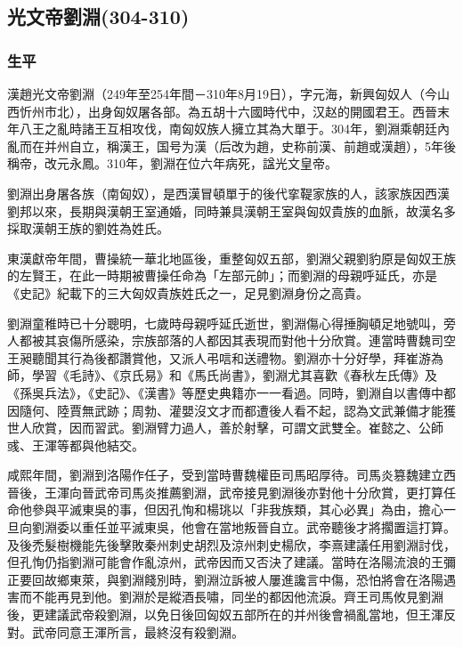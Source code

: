 
\subsection{光文帝劉淵\tiny(304-310)}

\subsubsection{生平}

漢趙光文帝劉淵（249年至254年間－310年8月19日），字元海，新興匈奴人（今山西忻州市北），出身匈奴屠各部。為五胡十六國時代中，汉赵的開國君王。西晉末年八王之亂時諸王互相攻伐，南匈奴族人擁立其為大單于。304年，劉淵乘朝廷內亂而在并州自立，稱漢王，国号为漢（后改为趙，史称前漢、前趙或漢趙），5年後稱帝，改元永鳳。310年，劉淵在位六年病死，諡光文皇帝。

劉淵出身屠各族（南匈奴），是西漢冒頓單于的後代挛鞮家族的人，該家族因西漢劉邦以來，長期與漢朝王室通婚，同時兼具漢朝王室與匈奴貴族的血脈，故漢名多採取漢朝王族的劉姓為姓氏。

東漢獻帝年間，曹操統一華北地區後，重整匈奴五部，劉淵父親劉豹原是匈奴王族的左賢王，在此一時期被曹操任命為「左部元帥」；而劉淵的母親呼延氏，亦是《史記》紀載下的三大匈奴貴族姓氏之一，足見劉淵身份之高貴。

劉淵童稚時已十分聰明，七歲時母親呼延氏逝世，劉淵傷心得捶胸頓足地號叫，旁人都被其哀傷所感染，宗族部落的人都因其表現而對他十分欣賞。連當時曹魏司空王昶聽聞其行為後都讚賞他，又派人弔唁和送禮物。劉淵亦十分好學，拜崔游為師，學習《毛詩》、《京氏易》和《馬氏尚書》，劉淵尤其喜歡《春秋左氏傳》及《孫吳兵法》，《史記》、《漢書》等歷史典籍亦一一看過。同時，劉淵自以書傳中都因隨何、陸賈無武跡；周勃、灌嬰沒文才而都遭後人看不起，認為文武兼備才能獲世人欣賞，因而習武。劉淵臂力過人，善於射擊，可謂文武雙全。崔懿之、公師彧、王渾等都與他結交。

咸熙年間，劉淵到洛陽作任子，受到當時曹魏權臣司馬昭厚待。司馬炎篡魏建立西晉後，王渾向晉武帝司馬炎推薦劉淵，武帝接見劉淵後亦對他十分欣賞，更打算任命他參與平滅東吳的事，但因孔恂和楊珧以「非我族類，其心必異」為由，擔心一旦向劉淵委以重任並平滅東吳，他會在當地叛晉自立。武帝聽後才將擱置這打算。及後禿髮樹機能先後擊敗秦州刺史胡烈及涼州刺史楊欣，李熹建議任用劉淵討伐，但孔恂仍指劉淵可能會作亂涼州，武帝因而又否決了建議。當時在洛陽流浪的王彌正要回故鄉東萊，與劉淵餞別時，劉淵泣訴被人屢進讒言中傷，恐怕將會在洛陽遇害而不能再見到他。劉淵於是縱酒長嘯，同坐的都因他流淚。齊王司馬攸見劉淵後，更建議武帝殺劉淵，以免日後回匈奴五部所在的并州後會禍亂當地，但王渾反對。武帝同意王渾所言，最終沒有殺劉淵。

